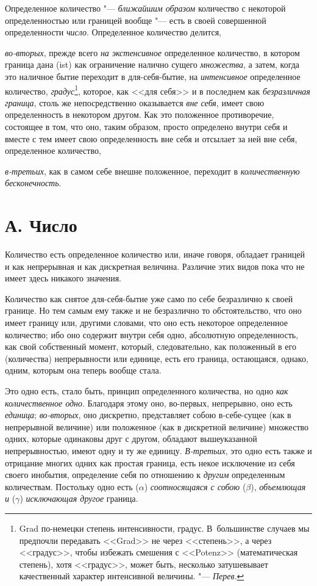 Определенное количество "--- {\em ближайшим образом}
количество с некоторой определенностью или границей вообще "--- есть
в своей совершенной определенности {\em число}. Определенное
количество делится,

{\em во-вторых}, прежде всего
{\em на экстенсивное} определенное количество, в
котором граница дана (ist) как ограничение налично сущего
{\em множества}, а затем, когда это наличное бытие
переходит в для-себя-бытие, на {\em интенсивное}
определенное количество, {\em градус}\footnote{Grad
по-немецки степень интенсивности, градус. В~большинстве
случаев мы предпочли передавать <<Grad>> не через <<степень>>, а через
<<градус>>, чтобы избежать смешения с <<Potenz>> (математическая степень), хотя
<<градус>>, может быть, несколько затушевывает качественный характер
интенсивной величины. "--- {\em Перев}.}, которое, как <<для
себя>> и в последнем как {\em безразличная граница},
столь же непосредственно оказывается {\em вне себя},
имеет свою определенность в некотором другом. Как это положенное
противоречие, состоящее в том, что оно, таким образом, просто определено
внутри себя и вместе с тем имеет свою определенность вне себя и отсылает за
ней вне себя, определенное количество,

{\em в-третьих}, как в самом себе внешне положенное,
переходит в {\em количественную бесконечность}.

\section[А. Число]{А. Число}
Количество есть определенное количество или, иначе говоря, обладает границей
и как непрерывная и как дискретная величина. Различие этих видов пока что
не имеет здесь никакого значения.

Количество как снятое для-себя-бытие уже само по себе безразлично к своей
границе. Но тем самым ему также и не безразлично то обстоятельство, что оно
имеет границу или, другими словами, что оно есть некоторое определенное
количество; ибо оно содержит внутри себя одно, абсолютную определенность,
как свой собственный момент, который, следовательно, как положенный в его
(количества) непрерывности или единице, есть его граница, остающаяся,
однако, одним, которым она теперь вообще стала.

Это одно есть, стало быть, принцип определенного количества, но одно
{\em как количественное одно}. Благодаря этому оно,
во-первых, непрерывно, оно есть {\em единица};
{\em во-вторых}, оно дискретно, представляет собою
в-себе-сущее (как в непрерывной величине) или положенное (как в дискретной
величине) множество одних, которые одинаковы друг с другом, обладают
вышеуказанной непрерывностью, имеют одну и ту же единицу.
{\em В-третьих}, это одно есть также и отрицание многих
одних как простая граница, есть некое исключение из себя своего инобытия,
определение себя по отношению к {\em другим}
определенным количествам. Постольку одно есть ($\alpha $)
{\em соотносящаяся с собою} ($\beta $),
{\em объемлющая и} ($\gamma $)
{\em исключающая другое} граница.

